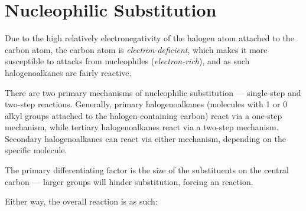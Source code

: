 









































	\pagebreak
	\hypertarget{AppendixNucleophilicSubstitution}{}
	\section{Nucleophilic Substitution}

		Due to the high relatively electronegativity of the halogen atom attached to the carbon atom, the carbon atom is
		\textit{electron-deficient}, which makes it more susceptible to attacks from nucleophiles (\textit{electron-rich}), and
		as such halogenoalkanes are fairly reactive.

		There are two primary mechanisms of nucleophilic substitution --- single-step and two-step reactions. Generally, primary
		halogenoalkanes (molecules with 1 or 0 alkyl groups attached to the halogen-containing carbon) react via a one-step
		mechanism, while tertiary halogenoalkanes react via a two-step mechanism. Secondary halogenoalkanes can react via either
		mechanism, depending on the specific molecule.

		The primary differentiating factor is the size of the substituents on the central carbon --- larger groups will hinder
		\sntwo{} substitution, forcing an \snone{} reaction.

		Either way, the overall reaction is as such:


